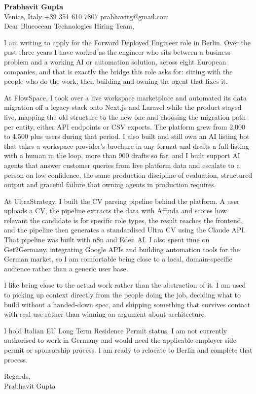 \documentclass[a4paper,10.5pt]{article}
\begin{document}
\textbf{Prabhavit Gupta}\\
Venice, Italy \textbar{} +39 351 610 7807 \textbar{} prabhavitg@gmail.com\\[10pt]
Dear Blueocean Technologies Hiring Team,

I am writing to apply for the Forward Deployed Engineer role in Berlin. Over the past three years I have worked as the engineer who sits between a business problem and a working AI or automation solution, across eight European companies, and that is exactly the bridge this role asks for: sitting with the people who do the work, then building and owning the agent that fixes it.

At FlowSpace, I took over a live workspace marketplace and automated its data migration off a legacy stack onto Next.js and Laravel while the product stayed live, mapping the old structure to the new one and choosing the migration path per entity, either API endpoints or CSV exports. The platform grew from 2,000 to 4,500 plus users during that period. I also built and still own an AI listing bot that takes a workspace provider's brochure in any format and drafts a full listing with a human in the loop, more than 900 drafts so far, and I built support AI agents that answer customer queries from live platform data and escalate to a person on low confidence, the same production discipline of evaluation, structured output and graceful failure that owning agents in production requires.

At UltraStrategy, I built the CV parsing pipeline behind the platform. A user uploads a CV, the pipeline extracts the data with Affinda and scores how relevant the candidate is for specific role types, the result reaches the frontend, and the pipeline then generates a standardised Ultra CV using the Claude API. That pipeline was built with n8n and Eden AI. I also spent time on Get2Germany, integrating Google APIs and building automation tools for the German market, so I am comfortable being close to a local, domain-specific audience rather than a generic user base.

I like being close to the actual work rather than the abstraction of it. I am used to picking up context directly from the people doing the job, deciding what to build without a handed-down spec, and shipping something that survives contact with real use rather than winning an argument about architecture.

I hold Italian EU Long Term Residence Permit status. I am not currently authorised to work in Germany and would need the applicable employer side permit or sponsorship process. I am ready to relocate to Berlin and complete that process.

Regards,\\
Prabhavit Gupta
\end{document}
